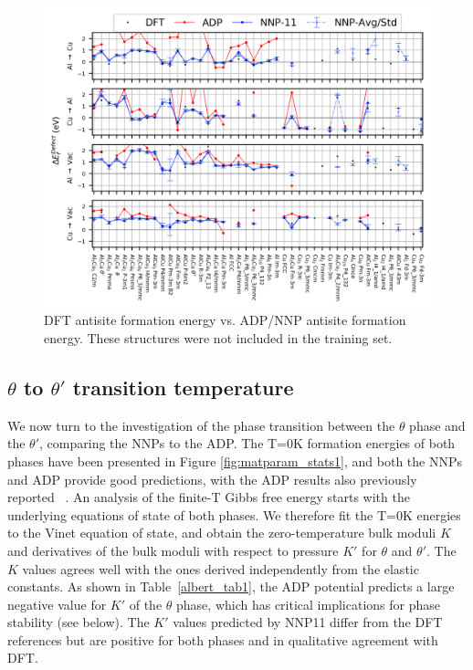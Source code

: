 \documentclass{article}
\begin{document}
\begin{figure}[H]%
\centering%
\includegraphics[width=1\textwidth,center]{figures/antisite_vacancies.png}%
\caption{DFT antisite formation energy vs. ADP/NNP antisite formation energy.
These structures were not included in the training set.}%
\label{fig:antisite_plot}
\end{figure}

\subsection{$\theta$ to $\theta'$ transition temperature} \label{sct:thetap_theta_transition}
We now turn to the investigation of the phase transition between the $\theta$ phase and the $\theta'$, comparing the NNPs to the ADP. The T=0K formation energies of both phases have been presented in Figure \ref{fig:matparam_stats1}, and both the NNPs and ADP provide good predictions, with the ADP results also previously reported ~\cite{Apostol2011}. An analysis of the finite-T Gibbs free energy starts with the underlying equations of state of both phases. We therefore fit the T=0K energies to the Vinet equation of state, and obtain the zero-temperature bulk moduli $K$ and derivatives of the bulk moduli with respect to pressure $K'$ for $\theta$ and $\theta
'$.  The $K$ values agrees well with the ones derived independently from the elastic constants. As shown in Table~\ref{albert_tab1}, the ADP potential predicts a large negative value for $K'$ of the $\theta$ phase, which has critical implications for phase stability (see below). The $K'$ values predicted by NNP11 differ from the DFT references but are positive for both phases and in qualitative agreement with DFT.
\end{document}
